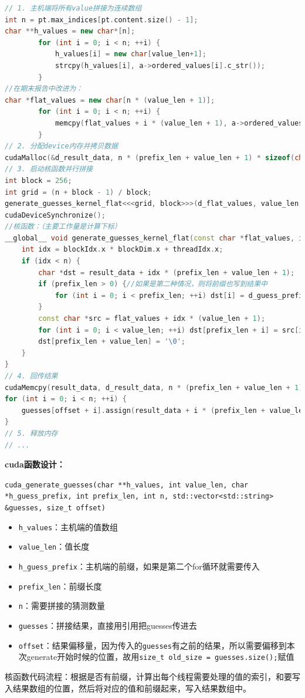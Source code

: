 \documentclass[a4paper]{article}
\begin{document}
\begin{lstlisting}[language=C++, caption={CUDA并行口令猜测核心流程}]
// 1. 主机端将所有value拼接为连续数组
int n = pt.max_indices[pt.content.size() - 1];
char **h_values = new char*[n];
        for (int i = 0; i < n; ++i) {
            h_values[i] = new char[value_len+1];
            strcpy(h_values[i], a->ordered_values[i].c_str());
        }
//在期末报告中改进为：
char *flat_values = new char[n * (value_len + 1)];
        for (int i = 0; i < n; ++i) {
            memcpy(flat_values + i * (value_len + 1), a->ordered_values[i].c_str(), value_len + 1);
        }
// 2. 分配device内存并拷贝数据
cudaMalloc(&d_result_data, n * (prefix_len + value_len + 1) * sizeof(char));
// 3. 启动核函数并行拼接
int block = 256;
int grid = (n + block - 1) / block;
generate_guesses_kernel_flat<<<grid, block>>>(d_flat_values, value_len, d_guess_prefix, prefix_len, d_result_data, n);
cudaDeviceSynchronize();
//核函数：（主要工作量是计算下标）
__global__ void generate_guesses_kernel_flat(const char *flat_values, int value_len, const char *d_guess_prefix, int prefix_len, char *result_data, int n) {
    int idx = blockIdx.x * blockDim.x + threadIdx.x;
    if (idx < n) {
        char *dst = result_data + idx * (prefix_len + value_len + 1);
        if (prefix_len > 0) {//如果是第二种情况，则将前缀也写到结果中
            for (int i = 0; i < prefix_len; ++i) dst[i] = d_guess_prefix[i];
        }
        const char *src = flat_values + idx * (value_len + 1);
        for (int i = 0; i < value_len; ++i) dst[prefix_len + i] = src[i];
        dst[prefix_len + value_len] = '\0';
    }
}
// 4. 回传结果
cudaMemcpy(result_data, d_result_data, n * (prefix_len + value_len + 1) * sizeof(char), cudaMemcpyDeviceToHost);
for (int i = 0; i < n; ++i) {
    guesses[offset + i].assign(result_data + i * (prefix_len + value_len + 1));
}
// 5. 释放内存
// ...
\end{lstlisting}
\textbf{cuda函数设计：}

\texttt{cuda\_generate\_guesses(char **h\_values, int value\_len, char *h\_guess\_prefix, int prefix\_len, int n, std::vector<std::string> \&guesses, size\_t offset)}
    \begin{itemize}
        \item \texttt{h\_values}：主机端的值数组
        \item \texttt{value\_len}：值长度
        \item \texttt{h\_guess\_prefix}：主机端的前缀，如果是第二个for循环就需要传入
        \item \texttt{prefix\_len}：前缀长度
        \item \texttt{n}：需要拼接的猜测数量
        \item \texttt{guesses}：拼接结果，直接用引用把guesses传进去
        \item \texttt{offset}：结果偏移量，因为传入的\texttt{guesses}有之前的结果，所以需要偏移到本次generate开始时候的位置，故用\texttt{size\_t old\_size = guesses.size();}赋值
    \end{itemize}
\par 核函数代码流程：根据是否有前缀，计算出每个线程需要处理的值的索引，和要写入结果数组的位置，然后将对应的值和前缀起来，写入结果数组中。
\end{document}
